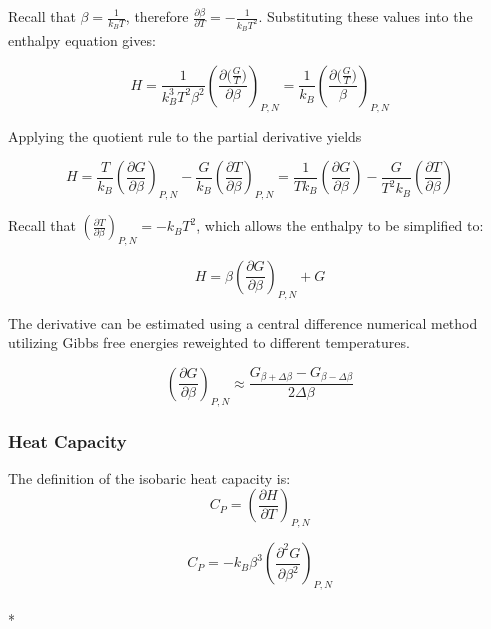 \documentclass[a4paper,12pt]{article}
\begin{document}
Recall that $\beta = \frac{1}{k_B T}$, therefore $\frac{\partial \beta}{\partial T} = - \frac{1}{k_B T^2}$. Substituting these values into the enthalpy equation gives:



\begin{equation}H = \frac{1}{k_B^3 T^2 \beta^2} \left(\frac{\partial \big(\frac{G}{T}\big)}{\partial \beta}\right)_{P,N} = \frac{1}{k_B} \left(\frac{\partial \big(\frac{G}{T}\big)}{\beta}\right)_{P,N}\end{equation}


Applying the quotient rule to the partial derivative yields


\begin{equation}H = \frac{T}{k_B} \left(\frac{\partial G}{\partial \beta}\right)_{P, N} - \frac{G}{k_B}\left(\frac{\partial T}{\partial \beta}\right)_{P, N} = \frac{1}{T k_B} \left(\frac{\partial G}{\partial \beta}\right) - \frac{G}{T^2 k_B} \left(\frac{\partial T}{\partial \beta}\right)\end{equation}


Recall that $\left(\frac{\partial T}{\partial \beta}\right)_{P, N} = -k_B T^2$, which allows the enthalpy to be simplified to:


\begin{equation} H = \beta \left(\frac{\partial G}{\partial \beta}\right)_{P, N} + G\end{equation}


The derivative can be estimated using a central difference numerical method utilizing Gibbs free energies reweighted to different temperatures.

\begin{equation} \left( \frac{\partial G}{\partial \beta} \right)_{P,N} \approx \frac{G_{\beta + \Delta \beta} - G_{\beta -\Delta \beta}}{2\Delta \beta} \end{equation}

\subsubsection{Heat Capacity}
The definition of the isobaric heat capacity is:
\begin{equation}C_P =\left( \frac{\partial H}{\partial T}\right)_{P,N}\end{equation}

\begin{equation}C_P =  -k_B \beta^3 \left(\frac{\partial^2 G}{\partial \beta^2}\right)_{P,N}\end{equation}\\*
\end{document}
